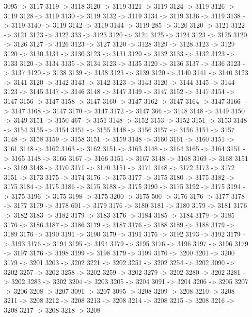 {	3095 -> 3117
	3119 -> 3118
	3120 -> 3119
	3121 -> 3119
	3124 -> 3119
	3126 -> 3119
	3128 -> 3119
	3130 -> 3119
	3132 -> 3119
	3134 -> 3119
	3136 -> 3119
	3138 -> 3119
	3140 -> 3119
	3142 -> 3119
	3144 -> 3119
	285 -> 3120
	3120 -> 3121
	3122 -> 3121
	3123 -> 3122
	333 -> 3123
	3120 -> 3124
	3125 -> 3124
	3123 -> 3125
	3120 -> 3126
	3127 -> 3126
	3123 -> 3127
	3120 -> 3128
	3129 -> 3128
	3123 -> 3129
	3120 -> 3130
	3131 -> 3130
	3123 -> 3131
	3120 -> 3132
	3133 -> 3132
	3123 -> 3133
	3120 -> 3134
	3135 -> 3134
	3123 -> 3135
	3120 -> 3136
	3137 -> 3136
	3123 -> 3137
	3120 -> 3138
	3139 -> 3138
	3123 -> 3139
	3120 -> 3140
	3141 -> 3140
	3123 -> 3141
	3120 -> 3142
	3143 -> 3142
	3123 -> 3143
	3120 -> 3144
	3145 -> 3144
	3123 -> 3145
	3147 -> 3146
	3148 -> 3147
	3149 -> 3147
	3152 -> 3147
	3154 -> 3147
	3156 -> 3147
	3158 -> 3147
	3160 -> 3147
	3162 -> 3147
	3164 -> 3147
	3166 -> 3147
	3168 -> 3147
	3170 -> 3147
	3172 -> 3147
	366 -> 3148
	3148 -> 3149
	3150 -> 3149
	3151 -> 3150
	467 -> 3151
	3148 -> 3152
	3153 -> 3152
	3151 -> 3153
	3148 -> 3154
	3155 -> 3154
	3151 -> 3155
	3148 -> 3156
	3157 -> 3156
	3151 -> 3157
	3148 -> 3158
	3159 -> 3158
	3151 -> 3159
	3148 -> 3160
	3161 -> 3160
	3151 -> 3161
	3148 -> 3162
	3163 -> 3162
	3151 -> 3163
	3148 -> 3164
	3165 -> 3164
	3151 -> 3165
	3148 -> 3166
	3167 -> 3166
	3151 -> 3167
	3148 -> 3168
	3169 -> 3168
	3151 -> 3169
	3148 -> 3170
	3171 -> 3170
	3151 -> 3171
	3148 -> 3172
	3173 -> 3172
	3151 -> 3173
	3175 -> 3174
	3176 -> 3175
	3177 -> 3175
	3180 -> 3175
	3182 -> 3175
	3184 -> 3175
	3186 -> 3175
	3188 -> 3175
	3190 -> 3175
	3192 -> 3175
	3194 -> 3175
	3196 -> 3175
	3198 -> 3175
	3200 -> 3175
	500 -> 3176
	3176 -> 3177
	3178 -> 3177
	3179 -> 3178
	601 -> 3179
	3176 -> 3180
	3181 -> 3180
	3179 -> 3181
	3176 -> 3182
	3183 -> 3182
	3179 -> 3183
	3176 -> 3184
	3185 -> 3184
	3179 -> 3185
	3176 -> 3186
	3187 -> 3186
	3179 -> 3187
	3176 -> 3188
	3189 -> 3188
	3179 -> 3189
	3176 -> 3190
	3191 -> 3190
	3179 -> 3191
	3176 -> 3192
	3193 -> 3192
	3179 -> 3193
	3176 -> 3194
	3195 -> 3194
	3179 -> 3195
	3176 -> 3196
	3197 -> 3196
	3179 -> 3197
	3176 -> 3198
	3199 -> 3198
	3179 -> 3199
	3176 -> 3200
	3201 -> 3200
	3179 -> 3201
	3203 -> 3202
	3221 -> 3202
	3251 -> 3202
	3254 -> 3202
	3090 -> 3202
	3257 -> 3202
	3258 -> 3202
	3259 -> 3202
	3279 -> 3202
	3280 -> 3202
	3281 -> 3202
	3283 -> 3202
	3204 -> 3203
	3205 -> 3204
	3091 -> 3204
	3206 -> 3205
	3207 -> 3206
	3208 -> 3207
	3091 -> 3207
	3095 -> 3208
	3209 -> 3208
	3210 -> 3208
	3211 -> 3208
	3212 -> 3208
	3213 -> 3208
	3214 -> 3208
	3215 -> 3208
	3216 -> 3208
	3217 -> 3208
	3218 -> 3208
}
